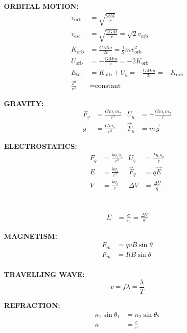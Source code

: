 \documentclass[11pt]{article}
\begin{document}
\begin{multicols*}{3}
  \textbf{ORBITAL MOTION:}
  \begin{align*}
    v_\text{orb} &=\sqrt{\frac{GM}r}\\
    v_\text{esc} &=\sqrt{\frac{2GM}r}=\sqrt2v_\text{orb}\\
    K_\text{orb} &=\frac{GMm}{2r}=\frac12mv_\text{orb}^2\\
    U_\text{orb} &=-\frac{GMm}r=-2K_\text{orb}\\
    E_\text{tot} &=K_\text{orb}+U_g=-\frac{GMm}{2r}=-K_\text{orb}\\
    \frac{T^2}{r^3}&=\text{constant}
  \end{align*}

  \textbf{GRAVITY:}
  \begin{align*}
    F_g &= \frac{Gm_1m_2}{r^2}  &U_g &=-\frac{Gm_1m_2}r\\
    g &=\frac{Gm_s}{r^2}       &\vec F_g &= m\vec g
  \end{align*}

  \textbf{ELECTROSTATICS:}
  \begin{align*}
    F_q &= \frac{kq_1q_2}{r^2}  &U_q     &= \frac{kq_1q_2}r\\
    E &= \frac{kq_s}{r^2}      &\vec F_q &= q\vec E\\
    V &= \frac{kq_s}r          &\Delta V &=\frac{\Delta U}q\\
  \end{align*}
  
  \vspace{-.2in}\\

  \vspace{-.2in}\begin{align*}
    E &= \frac{\sigma}{\varepsilon_0}=\frac{\Delta V}d
  \end{align*}

  \textbf{MAGNETISM:}
  \begin{align*}
    F_m &= qvB\sin\theta\\
    F_m &= IlB\sin\theta\\
  \end{align*}

  \textbf{TRAVELLING WAVE:}
  \begin{displaymath}
    v=f\lambda=\frac\lambda{T}
  \end{displaymath}

  \textbf{REFRACTION:}
  \begin{align*}
    n_1\sin\theta_1 &= n_2\sin\theta_2\\
    n &= \frac cv
  \end{align*}


\end{multicols*}
\end{document}
